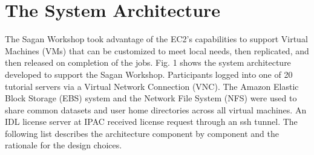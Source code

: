 \section{The System Architecture}

The Sagan Workshop took advantage of the EC2's capabilities to support Virtual Machines (VMs) that can be customized to meet local needs, then replicated, and then released on completion of the jobs. Fig. 1 shows the system architecture developed to support the Sagan Workshop. Participants logged into one of 20 tutorial servers via a Virtual Network Connection (VNC). The Amazon Elastic Block Storage (EBS) system and the Network File System (NFS) were used to share common datasets and user home directories across all virtual machines. An IDL license server at IPAC received license request through an ssh tunnel. The following list describes the architecture component by component and the rationale for the design choices.



